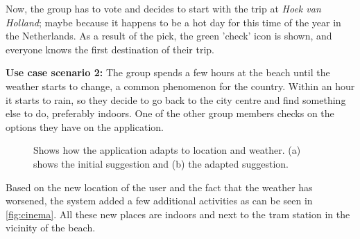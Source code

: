\documentclass[11pt,a4paper,oneside]{article}
\begin{document}
Now, the group has to vote and decides to start with the trip at \emph{Hoek van Holland}; maybe because it happens to be a hot day for this time of the year in the Netherlands. As a result of the pick, the green 'check' icon is shown, and everyone knows the first destination of their trip.

\textbf{Use case scenario 2:} The group spends a few hours at the beach until the weather starts to change, a common phenomenon for the country.  Within an hour it starts to rain, so they decide to go back to the city centre and find something else to do, preferably indoors. One of the other group members checks on the options they have on the application. 
\begin{figure}[H]
    \centering
    \qquad
    \caption{Shows how the application adapts to location and weather. (a) shows the initial suggestion and (b) the adapted suggestion.}
    \label{fig:cinema}
\end{figure}
Based on the new location of the user and the fact that the weather has worsened, the system added a few additional activities as can be seen in \autoref{fig:cinema}. All these new places are indoors and next to the tram station in the vicinity of the beach.
\end{document}
